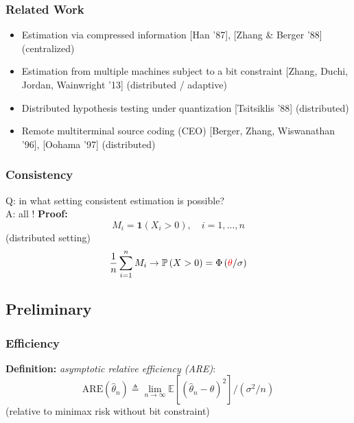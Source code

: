 \documentclass[mathserif]{beamer}
\newcommand{\thetac}{{\color{red} \theta}}
\newcommand{\Prob}{\mathbb{P}}
\begin{document}
\begin{frame}
\frametitle{Related Work}
\begin{itemize} 
\pause
\item Estimation via compressed information [Han '87], [Zhang \& Berger '88] (centralized)
\pause
\item Estimation from multiple machines subject to a bit constraint [Zhang, Duchi, Jordan, Wainwright '13] (distributed / adaptive)
\pause
\item Distributed hypothesis testing under quantization [Tsitsiklis '88] (distributed)
\pause
\item Remote multiterminal source coding (CEO) [Berger, Zhang, Wiswanathan '96], [Oohama '97] (distributed)
\end{itemize}
\end{frame}

\begin{frame}
\frametitle{Consistency}
Q: in what setting consistent estimation is possible? \\
\bigskip
\pause
A: all ! 
\pause
\bigskip
\textbf{Proof:}
\[
M_i = \mathbf 1(X_i>0),\quad i=1,\ldots,n
\]
(distributed setting)
\pause
\[
\frac{1}{n}\sum_{i=1}^n M_i \rightarrow \Prob\left(X>0 \right) = \Phi\left(\thetac / \sigma \right)
\]
\end{frame}


\subsection{Preliminary}

\begin{frame}
\frametitle{Efficiency}
\textbf{Definition:} \emph{asymptotic relative efficiency (ARE)}:
\[
\mathrm{ARE}(\widehat{\theta}_n) \triangleq \lim_{n\rightarrow \infty} \mathbb E \left[ \left(\widehat{\theta}_n-\theta \right)^2 \right] / \left(\sigma^2 / n \right)
\]
(relative to minimax risk without bit constraint)


\end{frame}
\end{document}
